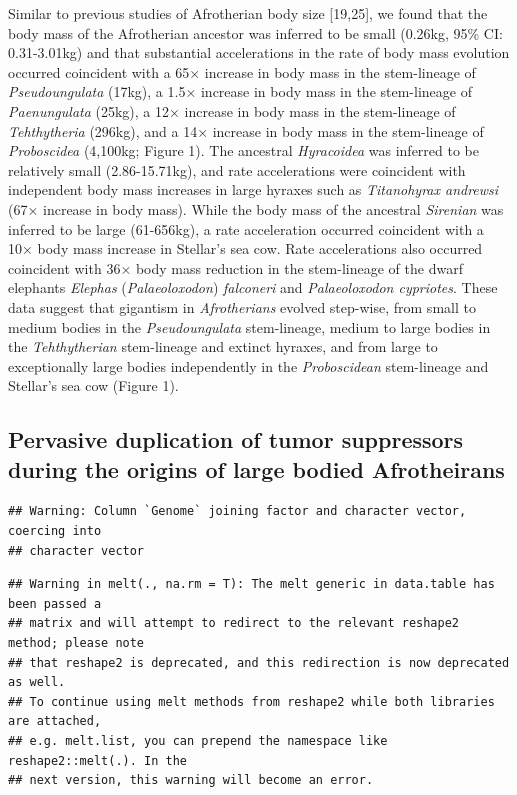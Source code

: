 \documentclass[10pt,letterpaper]{article}
\begin{document}
Similar to previous studies of Afrotherian body size {[}19,25{]}, we
found that the body mass of the Afrotherian ancestor was inferred to be
small (0.26kg, 95\% CI: 0.31-3.01kg) and that substantial accelerations
in the rate of body mass evolution occurred coincident with a 65×
increase in body mass in the stem-lineage of \emph{Pseudoungulata}
(17kg), a 1.5× increase in body mass in the stem-lineage of
\emph{Paenungulata} (25kg), a 12× increase in body mass in the
stem-lineage of \emph{Tehthytheria} (296kg), and a 14× increase in body
mass in the stem-lineage of \emph{Proboscidea} (4,100kg; Figure 1). The
ancestral \emph{Hyracoidea} was inferred to be relatively small
(2.86-15.71kg), and rate accelerations were coincident with independent
body mass increases in large hyraxes such as \emph{Titanohyrax andrewsi}
(67× increase in body mass). While the body mass of the ancestral
\emph{Sirenian} was inferred to be large (61-656kg), a rate acceleration
occurred coincident with a 10× body mass increase in Stellar's sea cow.
Rate accelerations also occurred coincident with 36× body mass reduction
in the stem-lineage of the dwarf elephants \emph{Elephas}
(\emph{Palaeoloxodon}) \emph{falconeri} and \emph{Palaeoloxodon
cypriotes}. These data suggest that gigantism in \emph{Afrotherians}
evolved step-wise, from small to medium bodies in the
\emph{Pseudoungulata} stem-lineage, medium to large bodies in the
\emph{Tehthytherian} stem-lineage and extinct hyraxes, and from large to
exceptionally large bodies independently in the \emph{Proboscidean}
stem-lineage and Stellar's sea cow (Figure 1).

\hypertarget{pervasive-duplication-of-tumor-suppressors-during-the-origins-of-large-bodied-afrotheirans}{%
\subsection{Pervasive duplication of tumor suppressors during the
origins of large bodied
Afrotheirans}\label{pervasive-duplication-of-tumor-suppressors-during-the-origins-of-large-bodied-afrotheirans}}

\begin{verbatim}
## Warning: Column `Genome` joining factor and character vector, coercing into
## character vector
\end{verbatim}

\begin{verbatim}
## Warning in melt(., na.rm = T): The melt generic in data.table has been passed a
## matrix and will attempt to redirect to the relevant reshape2 method; please note
## that reshape2 is deprecated, and this redirection is now deprecated as well.
## To continue using melt methods from reshape2 while both libraries are attached,
## e.g. melt.list, you can prepend the namespace like reshape2::melt(.). In the
## next version, this warning will become an error.
\end{verbatim}
\end{document}
